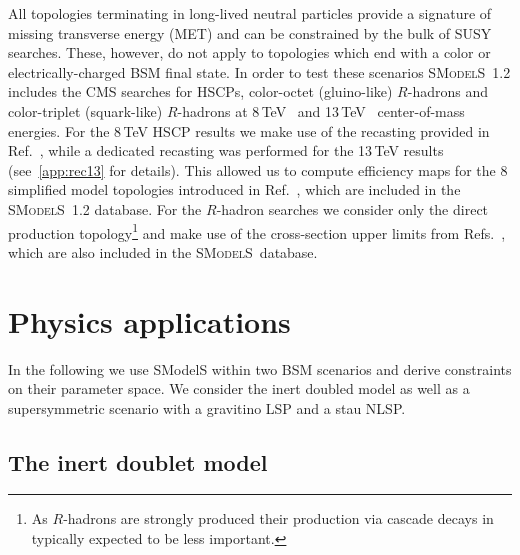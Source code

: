 \documentclass[preprint,number,sort&compress,twocolumn,3p]{elsstyarticle}
\newcommand{\smo}{\textsc{SModelS}}
\begin{document}
All topologies terminating in long-lived neutral particles provide a signature of missing transverse energy (MET) and can be constrained by  the bulk of SUSY searches. These, however, do not apply
to topologies which end with a color or electrically-charged BSM final state. In order to test these scenarios \smo~1.2 includes the CMS searches for HSCPs, color-octet (gluino-like) $R$-hadrons
and color-triplet (squark-like)  $R$-hadrons  at 8\,TeV~\cite{Chatrchyan:2013oca} and 13\,TeV~\cite{CMS-PAS-EXO-16-036} center-of-mass energies. For the 8\,TeV  HSCP results we make use of the recasting provided in Ref.~\cite{Khachatryan:2015lla}, while a dedicated recasting was performed for the 13\,TeV results (see~\ref{app:rec13} for details). This allowed us to compute efficiency maps for the 8 simplified model topologies introduced in Ref.~\cite{Heisig:2015yla}, which are included in the \smo~1.2 database.
For the $R$-hadron searches we consider only the direct production topology\footnote{As $R$-hadrons are strongly produced their production via cascade decays in typically expected to be less important.} and make use of the cross-section upper limits from Refs.~\cite{Chatrchyan:2013oca,CMS-PAS-EXO-16-036}, which are also included in the \smo\ database.

%
%
%
%




\section{Physics applications}\label{sec:physapp}

In the following we use SModelS within two BSM scenarios and derive constraints 
on their parameter space. We consider the inert doubled model as well as a supersymmetric scenario with a gravitino LSP
and a stau NLSP\@.






\subsection{The inert doublet model}\label{sec:IDM}
\end{document}
